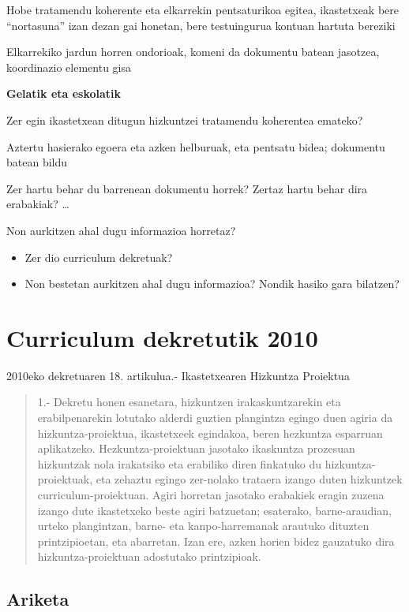 \documentclass[
]{book}
\providecommand{\tightlist}{%
  \setlength{\itemsep}{0pt}\setlength{\parskip}{0pt}}
\begin{document}
Hobe tratamendu koherente eta elkarrekin pentsaturikoa egitea, ikastetxeak bere ``nortasuna'' izan dezan gai honetan, bere testuingurua kontuan hartuta bereziki

Elkarrekiko jardun horren ondorioak, komeni da dokumentu batean jasotzea, koordinazio elementu gisa

\textbf{Gelatik eta eskolatik}

Zer egin ikastetxean ditugun hizkuntzei tratamendu koherentea emateko?

Aztertu hasierako egoera eta azken helburuak, eta pentsatu bidea; dokumentu batean bildu

Zer hartu behar du barrenean dokumentu horrek? Zertaz hartu behar dira erabakiak?
\ldots{}

Non aurkitzen ahal dugu informazioa horretaz?

\begin{itemize}
\tightlist
\item
  Zer dio curriculum dekretuak?
\item
  Non bestetan aurkitzen ahal dugu informazioa? Nondik hasiko gara bilatzen?
\end{itemize}

\hypertarget{curriculum-dekretutik-2010}{%
\section{Curriculum dekretutik 2010}\label{curriculum-dekretutik-2010}}

2010eko dekretuaren 18. artikulua.- Ikastetxearen Hizkuntza Proiektua

\begin{quote}
1.- Dekretu honen esanetara, hizkuntzen irakaskuntzarekin eta erabilpenarekin lotutako alderdi guztien plangintza egingo duen agiria da hizkuntza-proiektua, ikastetxeek egindakoa, beren hezkuntza esparruan aplikatzeko. Hezkuntza-proiektuan jasotako ikaskuntza prozesuan hizkuntzak nola irakatsiko eta erabiliko diren finkatuko du hizkuntza-proiektuak, eta zehaztu egingo zer-nolako trataera izango duten hizkuntzek curriculum-proiektuan. Agiri horretan jasotako erabakiek eragin zuzena izango dute ikastetxeko beste agiri batzuetan; esaterako, barne-araudian, urteko plangintzan, barne- eta kanpo-harremanak arautuko dituzten printzipioetan, eta abarretan. Izan ere, azken horien bidez gauzatuko dira hizkuntza-proiektuan adostutako printzipioak.
\end{quote}

\hypertarget{ariketa}{%
\subsection*{Ariketa}\label{ariketa}}
\end{document}

